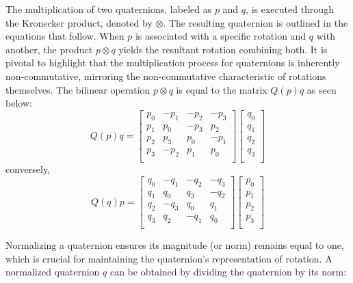 \documentclass{article}
\begin{document}
The multiplication of two quaternions, labeled as \( p \) and \( q \), is
executed through the Kronecker product, denoted by \( \otimes \). The resulting
quaternion is outlined in the equations that follow. When \( p \) is associated
with a specific rotation and \( q \) with another, the product \( p \otimes q \)
yields the resultant rotation combining both. It is pivotal to highlight that
the multiplication process for quaternions is inherently non-commutative,
mirroring the non-commutative characteristic of rotations themselves. The
bilinear operation \( p \otimes q \) is equal to the matrix \(Q(p)q\) as seen
below:
\begin{equation}
  Q(p)q = 
  \begin{bmatrix}
    p_0 & -p_1 & -p_2 & -p_3 \\
    p_1 & p_0 & -p_3 & p_2 \\
    p_2 & p_3 & p_0 & -p_1 \\
    p_3 & -p_2 & p_1 & p_0 \\
\end{bmatrix}
\begin{bmatrix}
    q_0 \\
    q_1 \\
    q_2 \\
    q_3 \\
\end{bmatrix}
\end{equation}
conversely, 
\begin{equation}
  Q(q)p = 
  \begin{bmatrix}
    q_0 & -q_1 & -q_2 & -q_3 \\
    q_1 & q_0 & q_3 & -q_2 \\
    q_2 & -q_3 & q_0 & q_1 \\
    q_3 & q_2 & -q_1 & q_0 \\
\end{bmatrix}
\begin{bmatrix}
    p_0 \\
    p_1 \\
    p_2 \\
    p_3 \\
\end{bmatrix}
\end{equation}

Normalizing a quaternion ensures its magnitude (or norm) remains equal to one,
which is crucial for maintaining the quaternion's representation of rotation. A
normalized quaternion \( q \) can be obtained by dividing the quaternion by its
norm:
\end{document}

